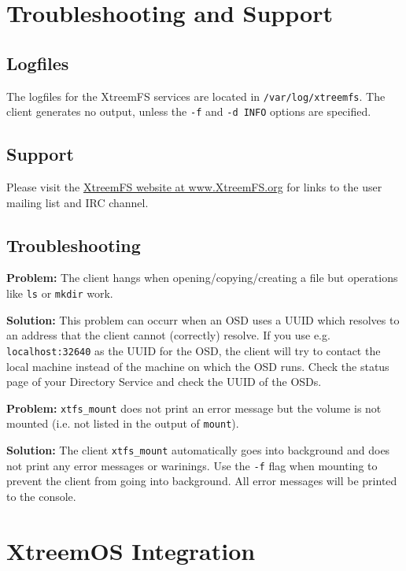 \documentclass[a4paper,10pt]{book}
\begin{document}
\chapter{Troubleshooting and Support}

\section{Logfiles}

The logfiles for the XtreemFS services are located in \texttt{/var/log/xtreemfs}. The client generates no output, unless the \texttt{-f} and \texttt{-d INFO} options are specified.

\section{Support}
Please visit the \href{http://www.XtreemFS.org}{XtreemFS website at www.XtreemFS.org} for links to the user mailing list and IRC channel.

\section{Troubleshooting}

\textbf{Problem: }The client hangs when opening/copying/creating a file but operations like \texttt{ls} or \texttt{mkdir} work.

\textbf{Solution: }This problem can occurr when an OSD uses a UUID which resolves to an address that the client cannot (correctly) resolve. If you use e.g. \texttt{localhost:32640} as the UUID for the OSD, the client will try to contact the local machine instead of the machine on which the OSD runs. Check the status page of your Directory Service and check the UUID of the OSDs.

\textbf{Problem: } \texttt{xtfs\_mount} does not print an error message but the volume is not mounted (i.e. not listed in the output of \texttt{mount}).

\textbf{Solution: } The client \texttt{xtfs\_mount} automatically goes into background and does not print any error messages or warinings. Use the \texttt{-f} flag when mounting to prevent the client from going into background. All error messages will be printed to the console.

\appendix

\chapter{XtreemOS Integration}
\end{document}
